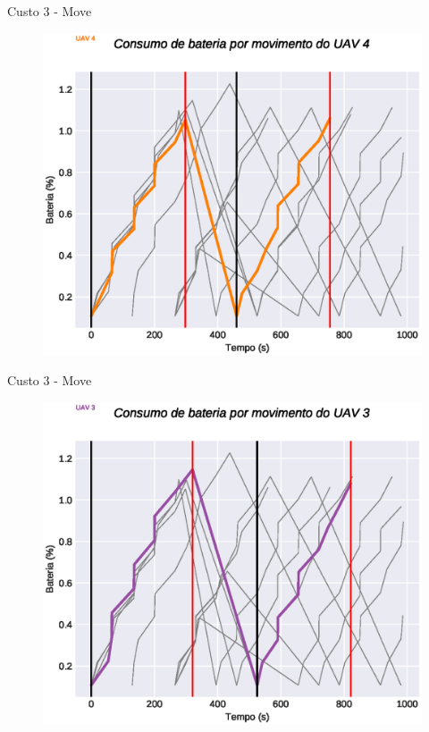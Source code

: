 \begin{frame}{Custo 3 - Move}
                \begin{figure}[!htb]
                     \includegraphics[width=\textwidth]{custo_3/uav_move_acum_uav_4.eps}
                 \end{figure}
            \end{frame}\begin{frame}{Custo 3 - Move}
                \begin{figure}[!htb]
                     \includegraphics[width=\textwidth]{custo_3/uav_move_acum_uav_3.eps}

\end{figure}
\end{frame}
